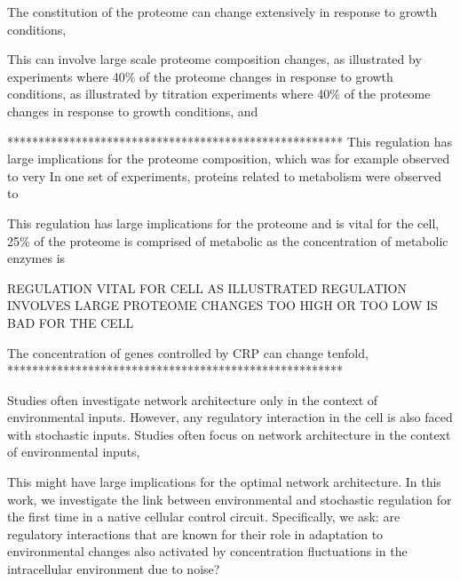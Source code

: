 %






The constitution of the proteome can change extensively in response to growth conditions, 

This can involve large scale proteome composition changes, 
as illustrated by experiments where 40\% of the proteome changes in response to growth conditions,
as illustrated by titration experiments where 40\% of the proteome changes in response to growth conditions,
and 


******************************************************
This regulation has large implications for the proteome composition,
which was for example observed to very 
In one set of experiments, proteins related to metabolism were observed to 

This regulation has large implications for the proteome and is vital for the cell,
25\% of the proteome is comprised of metabolic 
as the concentration of metabolic enzymes is 


REGULATION VITAL FOR CELL AS ILLUSTRATED
REGULATION INVOLVES LARGE PROTEOME CHANGES
TOO HIGH OR TOO LOW IS BAD FOR THE CELL


The concentration of genes controlled by CRP can change tenfold, 
******************************************************


Studies often investigate network architecture only in the context of environmental inputs. %
%
However, any regulatory interaction in the cell is also faced with stochastic inputs.
Studies often focus on network architecture in the context of environmental inputs,

%
This might have large implications for the optimal network architecture.
%
In this work, we investigate the link between environmental and stochastic regulation for the first time in a native cellular control circuit. %
%
Specifically, we ask:
are regulatory interactions that are known for their role in adaptation to environmental changes also 
activated 
by concentration fluctuations in the intracellular environment due to noise?





